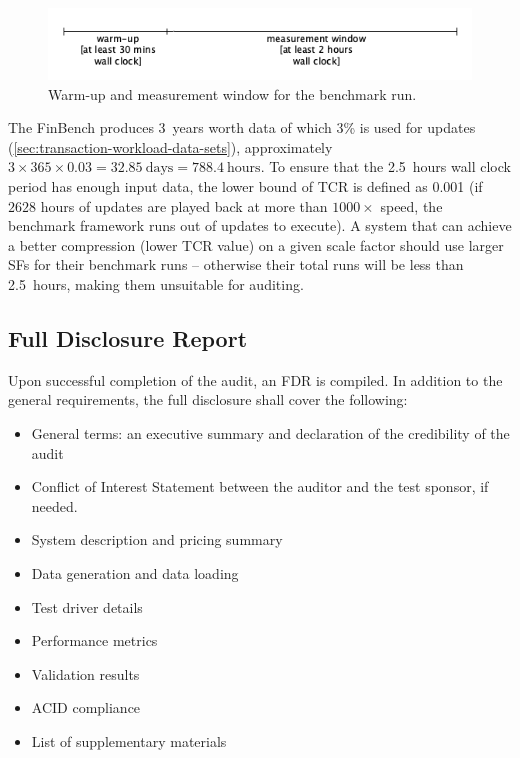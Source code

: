 \begin{figure}[h]
    \centering
    \includegraphics[width=.7\linewidth]{figures/measurement-window-selection}
    \caption{Warm-up and measurement window for the benchmark run.}
    \label{fig:measurement-window-selection}
\end{figure}

The FinBench \DataGen produces 3~years worth data of which 3\% is used for updates
(\autoref{sec:transaction-workload-data-sets}), \ie approximately $3 \times 365 \times 0.03 = 32.85~\text{days} =
    788.4~\text{hours}$. To ensure that the 2.5~hours wall clock period has enough input data, the lower bound of TCR is
defined as 0.001 (if $2628$ hours of updates are played back at more than $1000\times$ speed, the benchmark framework
runs out of updates to execute). A system that can achieve a better compression (\ie lower TCR value) on a given scale
factor should use larger SFs for their benchmark runs -- otherwise their total runs will be less than 2.5~hours, making
them unsuitable for auditing.


\subsection{Full Disclosure Report}
\label{sec:transaction-workload-fdr}

Upon successful completion of the audit, an FDR is compiled. In addition to the general requirements, the full disclosure shall cover the following:

\begin{itemize}
    \item General terms: an executive summary and declaration of the credibility of the audit
    \item Conflict of Interest Statement between the auditor and the test sponsor, if needed.
    \item System description and pricing summary
    \item Data generation and data loading
    \item Test driver details
    \item Performance metrics
    \item Validation results
    \item ACID compliance
    \item List of supplementary materials
\end{itemize}

